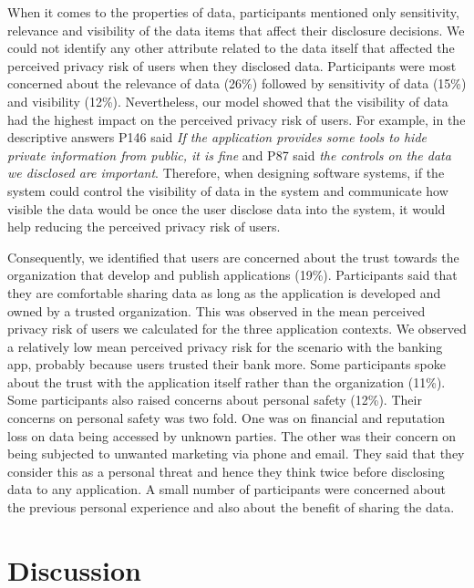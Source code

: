 \documentclass[10pt]{article}
\begin{document}
When it comes to the properties of data, participants mentioned only sensitivity, relevance and visibility of the data items that affect their disclosure decisions. We could not identify any other attribute related to the data itself that affected the perceived privacy risk of users when they disclosed data. Participants were most concerned about the relevance of data (26\%) followed by sensitivity of data (15\%) and visibility (12\%). Nevertheless, our model showed that the visibility of data had the highest impact on the perceived privacy risk of users. For example, in the descriptive answers P146 said \textit{If the application provides some tools to hide private information from public, it is fine} and P87 said \textit{the controls on the data we disclosed are important}. Therefore, when designing software systems, if the system could control the visibility of data in the system and communicate how visible the data would be once the user disclose data into the system, it would help reducing the perceived privacy risk of users. 

Consequently, we identified that users are concerned about the trust towards the organization that develop and publish applications (19\%). Participants said that they are comfortable sharing data as long as the application is developed and owned by a trusted organization. This was observed in the mean perceived privacy risk of users we calculated for the three application contexts. We observed a relatively low mean perceived privacy risk for the scenario with the banking app, probably because users trusted their bank more. Some participants spoke about the trust with the application itself rather than the organization (11\%). Some participants also raised concerns about personal safety (12\%). Their concerns on personal safety was two fold. One was on financial and reputation loss on data being accessed by unknown parties. The other was their concern on being subjected to unwanted marketing via phone and email. They said that they consider this as a personal threat and hence they think twice before disclosing data to any application. A small number of participants were concerned about the previous personal experience and also about the benefit of sharing the data. 

\section {Discussion}
\end{document}
